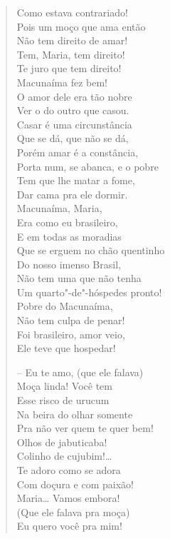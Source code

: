 {\begin{verse}
Como estava contrariado!\\
Pois um moço que ama então\\
Não tem direito de amar!\\
Tem, Maria, tem direito!\\
Te juro que tem direito!\\
Macunaíma fez bem!\\
O amor dele era tão nobre\\
Ver o do outro que casou.\\
Casar é uma circunstância\\
Que se dá, que não se dá,\\
Porém amar é a constância,\\
Porta num, se abanca, e o pobre\\
Tem que lhe matar a fome,\\
Dar cama pra ele dormir.\\
Macunaíma, Maria,\\
Era como eu brasileiro,\\
E em todas as moradias\\
Que se erguem no chão quentinho\\
Do nosso imenso Brasil,\\
Não tem uma que não tenha\\
Um quarto"-de"-hóspedes pronto!\\
Pobre do Macunaíma,\\
Não tem culpa de penar!\\
Foi brasileiro, amor veio,\\
Ele teve que hospedar!

-- Eu te amo, (que ele falava)\\
Moça linda! Você tem\\
Esse risco de urucum\\
Na beira do olhar somente\\
Pra não ver quem te quer bem!\\
Olhos de jabuticaba!\\
Colinho de cujubim!\ldots{}\\
Te adoro como se adora\\
Com doçura e com paixão!\\
Maria\ldots{} Vamos embora!\\
(Que ele falava pra moça)\\
Eu quero você pra mim!


\end{verse}}

